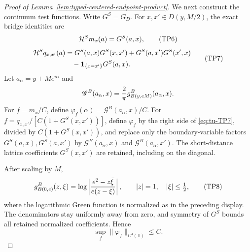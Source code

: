 \begin{proof}[Proof of Lemma~\ref{lem:typed-centered-endpoint-product}]
We next construct the continuum test functions.  Write \(G^S=G_D\).
For \(x,x'\in D(y,M/2)\), the exact bridge identities are
\begin{equation}
 {\cal H}^Sm_x(a)=G^S(a,x),                               \tag{TP6}\label{eq:tu-TP6}
\end{equation}
\begin{equation}
 \begin{split}
 {\cal H}^Sq_{x,x'}(a)
 &=G^S(a,x)G^S(x,x')+G^S(a,x')G^S(x',x)\\
 &\quad-\mathbf1_{\{x=x'\}}G^S(a,x).
 \end{split}                                               \tag{TP7}\label{eq:tu-TP7}
\end{equation}
Let \(a_\alpha=y+Me^{i\alpha}\) and
\[
       \mathscr G^B(a_\alpha,x)={2\over\pi}
              g_{B(y,eM)}^B(a_\alpha,x).
\]
For \(f=m_x/C\), define
\(\varphi_f(\alpha)=\mathscr G^B(a_\alpha,x)/C\).  For
\(f=q_{x,x'}/[C(1+G^S(x,x'))]\), define \(\varphi_f\) by the right side
of \eqref{eq:tu-TP7}, divided by \(C(1+G^S(x,x'))\), and replace only the boundary-variable factors
\(G^S(a,x),G^S(a,x')\) by \(\mathscr G^B(a_\alpha,x)\) and
\(\mathscr G^B(a_\alpha,x')\).  The short-distance lattice coefficients
\(G^S(x,x')\) are retained, including on the diagonal.

After scaling by \(M\),
\begin{equation}
 g_{B(0,e)}^B(z,\xi)=\log\left|{e^2-z\bar\xi\over e(z-\xi)}\right|,
       \qquad |z|=1,\quad|\xi|\le\tfrac12,               \tag{TP8}\label{eq:tu-TP8}
\end{equation}
where the logarithmic Green function is normalized as in the preceding
display. The denominators stay uniformly
away from zero, and symmetry of \(G^S\) bounds all retained normalized
coefficients.  Hence
\begin{equation}
                  \sup_f\|\varphi_f\|_{C^4(\mathbb T)}\le C.          \tag{TP9}\label{eq:tu-TP9}
\end{equation}


\end{proof}
